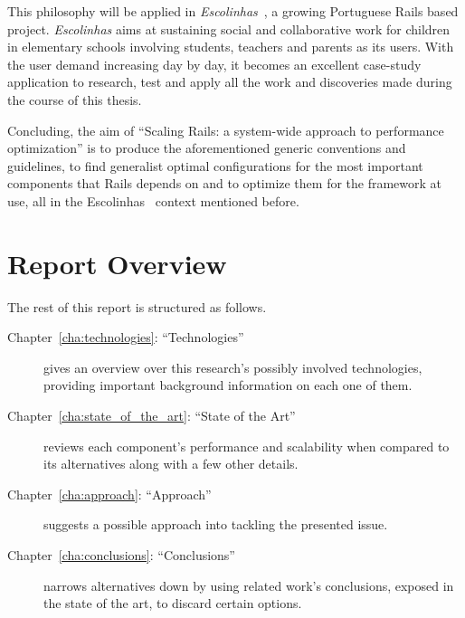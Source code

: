 This philosophy will be applied in \textit{Escolinhas}~\cite{escolinhas}, a growing Portuguese Rails based project. \textit{Escolinhas} aims at sustaining social and collaborative work for children in elementary schools involving students, teachers and parents as its users. With the user demand increasing day by day, it becomes an excellent case-study application to research, test and apply all the work and discoveries made during the course of this thesis.

Concluding, the aim of ``Scaling Rails: a system-wide approach to performance optimization'' is to produce the aforementioned generic conventions and guidelines, to find generalist optimal configurations for the most important components that Rails depends on and to optimize them for the framework at use, all in the Escolinhas~\cite{escolinhas} context mentioned before.


\section{Report Overview} %
\label{sec:report_overview}
The rest of this report is structured as follows.
\begin{description}
  \item[Chapter~\ref{cha:technologies}: ``Technologies''] gives an overview over this research's possibly involved technologies, providing important background information on each one of them.
  \item[Chapter~\ref{cha:state_of_the_art}: ``State of the Art''] reviews each component's performance and scalability when compared to its alternatives along with a few other details.
  \item[Chapter~\ref{cha:approach}: ``Approach''] suggests a possible approach into tackling the presented issue.
  \item[Chapter~\ref{cha:conclusions}: ``Conclusions''] narrows alternatives down by using related work's conclusions, exposed in the state of the art, to discard certain options.
\end{description}

